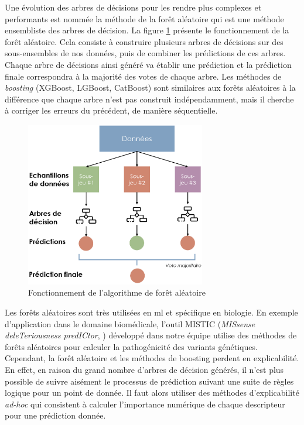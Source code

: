 Une évolution des arbres de décisions pour les rendre plus complexes et performants est nommée la méthode de la forêt aléatoire qui est une méthode ensembliste des arbres de décision. La figure \ref{fig:random-forest} présente le fonctionnement de la forêt aléatoire. Cela consiste à construire plusieurs arbres de décisions sur des sous-ensembles de nos données, puis de combiner les prédictions de ces arbres. Chaque arbre de décisions ainsi généré va établir une prédiction et la prédiction finale correspondra à la majorité des votes de chaque arbre. Les méthodes de \textit{boosting}  (XGBoost, LGBoost, CatBoost) sont similaires aux forêts aléatoires à la différence que chaque arbre n'est pas construit indépendamment, mais il cherche à corriger les erreurs du précédent, de manière séquentielle.
\begin{figure}[!htbp]
 \centering
 \includegraphics[width=0.7\textwidth]{figures/random_forest.png}
 \caption[Fonctionnement de l'algorithme de forêt aléatoire]{Fonctionnement de l'algorithme de forêt aléatoire}
 \label{fig:random-forest}
\end{figure}
Les forêts aléatoires sont très utilisées en \gls{ml} et spécifique en biologie. En exemple d'application dans le domaine biomédicale, l'outil MISTIC (\textit{MISsense deleTeriousness predICtor}, \cite{chennen_mistic_2020}) développé dans notre équipe utilise des méthodes de forêts aléatoires pour calculer la pathogénicité des variants génétiques. Cependant, la forêt aléatoire et les méthodes de boosting perdent en explicabilité. En effet, en raison du grand nombre d'arbres de décision générés, il n'est plus possible de suivre aisément le processus de prédiction suivant une suite de règles logique pour un point de donnée. Il faut alors utiliser des méthodes d'explicabilité \textit{ad-hoc} qui consistent à calculer l'importance numérique de chaque descripteur pour une prédiction donnée.


